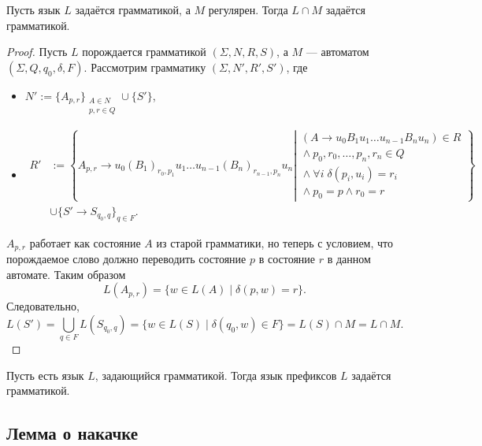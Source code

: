 \documentclass[12pt,a4paper]{article}
\begin{document}
    \begin{theorem}
        Пусть язык $L$ задаётся грамматикой, а $M$ регулярен. Тогда $L \cap M$ задаётся грамматикой.
    \end{theorem}

    \begin{proof}
        Пусть $L$ порождается грамматикой $(\Sigma, N, R, S)$, а $M$ --- автоматом $(\Sigma, Q, q_0, \delta, F)$. Рассмотрим грамматику $(\Sigma, N', R', S')$, где
        \begin{itemize}
            \item $N' := \{A_{p, r}\}_{\substack{A \in N\\p, r \in Q}} \cup \{S'\}$,
            \item
                \begin{align*}
                    R'
                    &:= \left\{A_{p, r} \to u_0 (B_1)_{r_0, p_1} u_1 \dots u_{n-1} (B_n)_{r_{n-1}, p_n} u_n \left|
                        \begin{gathered}
                            (A \to u_0 B_1 u_1 \dots u_{n-1} B_n u_n) \in R\\
                            {}\wedge p_0, r_0, \dots, p_n, r_n \in Q\\
                            {}\wedge \forall i \; \delta(p_i, u_i) = r_i\\
                            {}\wedge p_0 = p \wedge r_0 = r
                        \end{gathered}
                    \right.\right\}\\
                    &\cup \{S' \to S_{q_0, q}\}_{q \in F}.
                \end{align*}
        \end{itemize}
        $A_{p, r}$ работает как состояние $A$ из старой грамматики, но теперь с условием, что порождаемое слово должно переводить состояние $p$ в состояние $r$ в данном автомате. Таким образом
        \[L(A_{p, r}) = \{w \in L(A) \mid \delta(p, w) = r\}.\]
        Следовательно,
        \[L(S') = \bigcup_{q \in F} L(S_{q_0, q}) = \{w \in L(S) \mid \delta(q_0, w) \in F\} = L(S) \cap M = L \cap M.\] 
    \end{proof}

    \begin{theorem}
        Пусть есть язык $L$, задающийся грамматикой. Тогда язык префиксов $L$ задаётся грамматикой. 
    \end{theorem}

    \subsection{Лемма о накачке}
\end{document}
